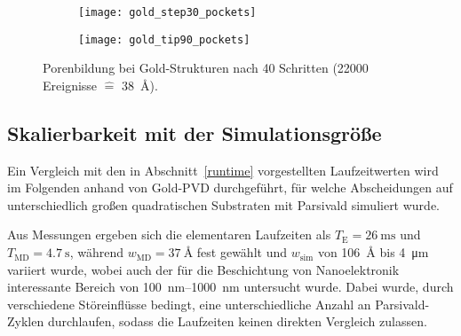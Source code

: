 \begin{figure}
  \captionsetup[subfigure]{singlelinecheck=false}
  \def\subfigwidth{0.49\textwidth}

  \begin{subfigure}[t]{\subfigwidth}
    \texttt{[image: gold\_step30\_pockets]}
    \label{fig:goldpockets-a}
  \end{subfigure}
  \hfill
  \begin{subfigure}[t]{\subfigwidth}
    \texttt{[image: gold\_tip90\_pockets]}
    \label{fig:goldpockets-b}
  \end{subfigure}

  \caption[Porenbildung bei Gold-Strukturen]{Porenbildung bei Gold-Strukturen nach 40 Schritten (\num{22000} Ereignisse $\hat{=}$ \SI{38}{\angstrom}).
  }
  \label{fig:goldpockets}
\end{figure}

\subsection{Skalierbarkeit mit der Simulationsgröße}
\label{goldscalability}

Ein Vergleich mit den in Abschnitt~\ref{runtime} vorgestellten Laufzeitwerten wird im Folgenden anhand von Gold-PVD durchgeführt, für welche Abscheidungen auf unterschiedlich großen quadratischen Substraten mit Parsivald simuliert wurde.

Aus Messungen ergeben sich die elementaren Laufzeiten als $T_\text{E} = \SI{26}{\milli\second}$ und $T_\text{MD} = \SI{4.7}{\second}$, während $w_\text{MD} = \SI{37}{\angstrom}$ fest gewählt und $w_\text{sim}$ von \SI{106}{\angstrom} bis \SI{4}{\micro\meter} variiert wurde, wobei auch der für die Beschichtung von Nanoelektronik interessante Bereich von \SIrange{100}{1000}{\nano\meter} untersucht wurde.
Dabei wurde, durch verschiedene Störeinflüsse bedingt, eine unterschiedliche Anzahl an Parsivald-Zyklen durchlaufen, sodass die Laufzeiten keinen direkten Vergleich zulassen.

